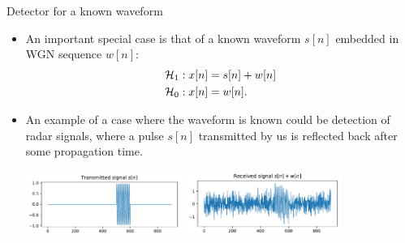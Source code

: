 \documentclass[10pt, aspectratio=169]{beamer} %
\begin{document}
\begin{frame}[allowframebreaks=0.8]
 {Detector for a known waveform}
\begin{itemize}

\item An important special case is that of a known waveform $s[n]$ embedded in WGN sequence $w[n]$:
\begin{align*}
{\cal H}_1 &: x[n] = s[n] + w[n] \\
{\cal H}_0 &: x[n] = w[n].
\end{align*}
\item An example of a case where the waveform is known could be detection of radar 
signals, where a pulse $s[n]$ transmitted by us is reflected back after some 
propagation time.

\centerline{\includegraphics[width=0.4\textwidth]{clean_sinusoid.pdf} \quad \includegraphics[width=0.4\textwidth]{noisy_sinusoid.pdf}}

\framebreak


\end{itemize}
\end{frame}
\end{document}
